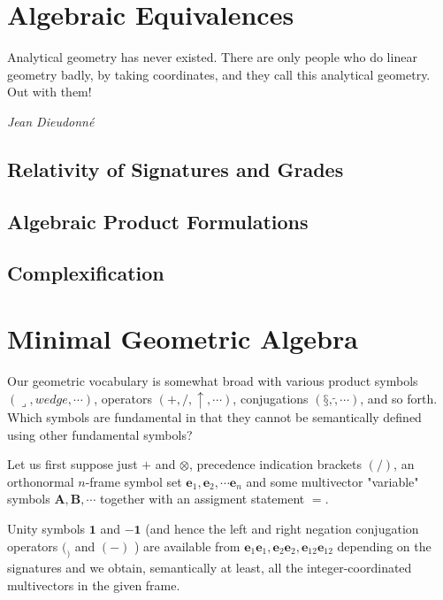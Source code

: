 \documentclass[a4paper]{book}
\numberwithin{equation}{chapter}
\begin{document}
    \section{Algebraic Equivalences}
    
    \epigraph{Analytical geometry has never existed. There are only people who do linear geometry badly, by taking coordinates, and they call this analytical geometry. Out with them!}{\textit{Jean Dieudonné }}

    \subsection{Relativity of Signatures and Grades}

    \subsection{Algebraic Product Formulations}

    \subsection{Complexification}

    \section{Minimal Geometric Algebra}

Our geometric vocabulary is somewhat broad with various product symbols $(\lrcorner, wedge, \cdots)$,
operators $(+,/,↑,\cdots)$, conjugations $(§,\tilde,\cdots)$, and so forth. 
Which symbols are fundamental in that they cannot be semantically defined 
using other fundamental symbols?

\vspace{\baselineskip}
    
Let us first suppose just $+$ and $\otimes$, precedence indication brackets $(/)$, an 
orthonormal $n$-frame symbol set ${\mathbf{e}_1,\mathbf{e}_2,\cdots \mathbf{e}_n}$
and some multivector "variable" symbols $\mathbf{A}, \mathbf{B}, \cdots$
together with an assigment statement $=$.

\vspace{\baselineskip}

Unity symbols $\mathbf{1}$ and $\mathbf{-1}$ (and hence the left and right negation conjugation operators $(_)$ and $(-)$ ) are available from 
${\mathbf{e}_1\mathbf{e}_1, \mathbf{e}_2\mathbf{e}_2, \mathbf{e}_{12}\mathbf{e}_{12}}$ depending on the signatures and we obtain, semantically at least, all the integer-coordinated multivectors in the given frame. 
\end{document}
